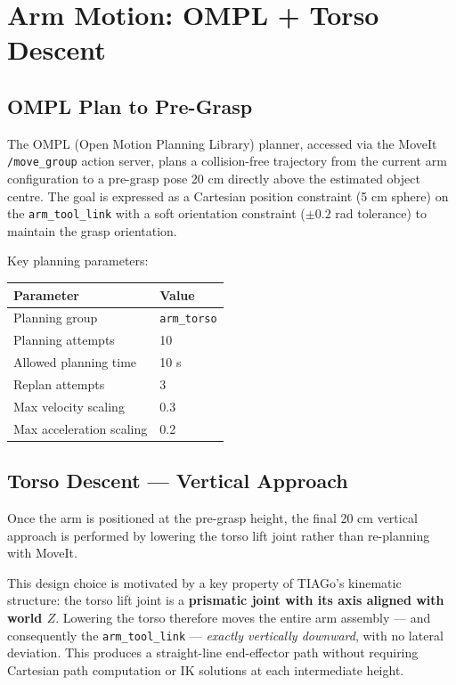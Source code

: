 \section{Arm Motion: OMPL + Torso Descent}

\subsection{OMPL Plan to Pre-Grasp}

The OMPL (Open Motion Planning Library) planner, accessed via the MoveIt
\texttt{/move\_group} action server, plans a collision-free trajectory from the current
arm configuration to a pre-grasp pose 20 cm directly above the estimated object centre.
The goal is expressed as a Cartesian position constraint (5 cm sphere) on the
\texttt{arm\_tool\_link} with a soft orientation constraint ($\pm 0.2$ rad tolerance)
to maintain the grasp orientation.

Key planning parameters:
\begin{center}
\begin{tabular}{ll}
\toprule
\textbf{Parameter} & \textbf{Value} \\
\midrule
Planning group & \texttt{arm\_torso} \\
Planning attempts & 10 \\
Allowed planning time & 10 s \\
Replan attempts & 3 \\
Max velocity scaling & 0.3 \\
Max acceleration scaling & 0.2 \\
\bottomrule
\end{tabular}
\end{center}

\subsection{Torso Descent — Vertical Approach}
\label{sec:torso_descent}

Once the arm is positioned at the pre-grasp height, the final 20 cm vertical
approach is performed by lowering the torso lift joint rather than re-planning with
MoveIt.

This design choice is motivated by a key property of TIAGo's kinematic structure:
the torso lift joint is a \textbf{prismatic joint with its axis aligned with world $Z$}.
Lowering the torso therefore moves the entire arm assembly — and consequently the
\texttt{arm\_tool\_link} — \emph{exactly vertically downward}, with no lateral deviation.
This produces a straight-line end-effector path without requiring Cartesian path
computation or IK solutions at each intermediate height.

